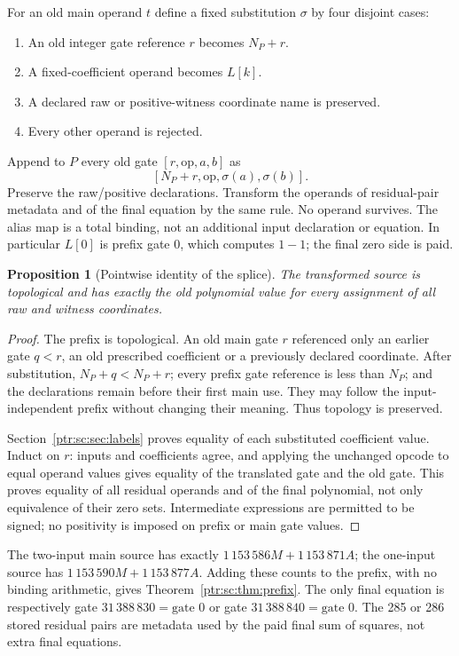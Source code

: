 \documentclass[11pt,letterpaper]{article}
\newtheorem{proposition}[theorem]{Proposition}
\theoremstyle{definition}\newtheorem{definition}[theorem]{Definition}
\theoremstyle{remark}\newtheorem{remark}[theorem]{Remark}
\newcommand{\codem}[1]{\mbox{\normalfont\ttfamily\detokenize{#1}}}
\begin{document}
For an old main operand $t$ define a fixed substitution $\sigma$ by four disjoint cases:
\begin{enumerate}
\item An old integer gate reference $r$ becomes $N_P+r$.
\item A fixed-coefficient operand \codem{C:k} becomes $L[k]$.
\item A declared raw or positive-witness coordinate name is preserved.
\item Every other operand is rejected.
\end{enumerate}
Append to $P$ every old gate $[r,\text{op},a,b]$ as
\[
 [N_P+r,\text{op},\sigma(a),\sigma(b)].
\]
Preserve the raw/positive declarations. Transform the operands of residual-pair metadata and of the final equation by the same rule. No \codem{C:} operand survives. The alias map is a total binding, not an additional input declaration or equation. In particular $L[0]$ is prefix gate 0, which computes $1-1$; the final zero side is paid.

\begin{proposition}[Pointwise identity of the splice]\label{ptr:sc:prop:splice}
The transformed source is topological and has exactly the old polynomial value for every assignment of all raw and witness coordinates.
\end{proposition}
\begin{proof}
The prefix is topological. An old main gate $r$ referenced only an earlier gate $q<r$, an old prescribed coefficient or a previously declared coordinate. After substitution, $N_P+q<N_P+r$; every prefix gate reference is less than $N_P$; and the declarations remain before their first main use. They may follow the input-independent prefix without changing their meaning. Thus topology is preserved.

Section~\ref{ptr:sc:sec:labels} proves equality of each substituted coefficient value. Induct on $r$: inputs and coefficients agree, and applying the unchanged opcode to equal operand values gives equality of the translated gate and the old gate. This proves equality of all residual operands and of the final polynomial, not only equivalence of their zero sets. Intermediate expressions are permitted to be signed; no positivity is imposed on prefix or main gate values.
\end{proof}
The two-input main source has exactly $1\,153\,586M+1\,153\,871A$; the one-input source has $1\,153\,590M+1\,153\,877A$. Adding these counts to the prefix, with no binding arithmetic, gives Theorem~\ref{ptr:sc:thm:prefix}. The only final equation is respectively gate $31\,388\,830=\text{gate }0$ or gate $31\,388\,840=\text{gate }0$. The 285 or 286 stored residual pairs are metadata used by the paid final sum of squares, not extra final equations.
\end{document}
